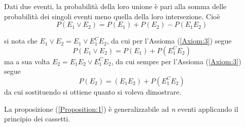 \documentclass{subfiles}
\begin{document}
\begin{Proposition}\label{Proposition:1}
    Dati due eventi, la probabilità della loro unione è pari alla somma delle probabilità dei singoli eventi meno quella della loro intersezione. Cioè
    \[
        P(E_{1} \lor E_{2}) = P(E_{1}) + P(E_{2}) - P(E_{1}E_{2})
    \]

    \begin{Proof*}
        si nota che \(E_{1} \lor E_{2} = E_{1} \lor E_{1}^{C}E_{2}\), da cui per l'Assioma (\ref{Axiom:3}) segue
        \[
            P(E_{1} \lor E_{2}) = P(E_{1}) + P(E_{1}^{C}E_{2})
        \]
        ma a sua volta \(E_{2} = E_{1}E_{2} \lor E_{1}^{C}E_{2}\), da cui sempre per l'Assioma (\ref{Axiom:3}) segue
        \[
            P(E_{2}) = (E_{1}E_{2}) + P(E_{1}^{C}E_{2})
        \]
        da cui sostituendo si ottiene quanto si voleva dimostrare.
    \end{Proof*}
\end{Proposition}
\begin{Note*}
    La proposizione (\ref{Proposition:1}) è generalizzabile ad \emph{n} eventi applicando il principio dei cassetti.
\end{Note*}
\end{document}
